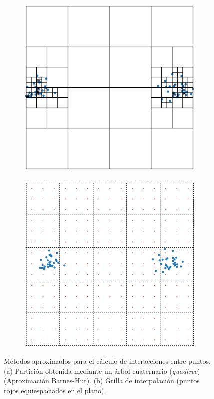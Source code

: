 \begin{figure}[!htbp]
    \centering
    \begin{subfigure}{.3\textwidth}
        \includegraphics[width=1\textwidth]{figuras/expertos/tsne/quadtree.png}
        \caption{}
    \end{subfigure}
    \hspace{5em}
    \begin{subfigure}{.3\textwidth}
        \includegraphics[width=1\textwidth]{figuras/expertos/tsne/interpolation_grid.png}
        \caption{}
    \end{subfigure}
    \caption{ Métodos aproximados para el cálculo de interacciones entre puntos. (a) Partición obtenida mediante un árbol cuaternario (\textit{quadtree}) (Aproximación Barnes-Hut). (b) Grilla de interpolación (puntos rojos equiespaciados en el plano).}
    \label{fig:tsne_approx}
\end{figure}

